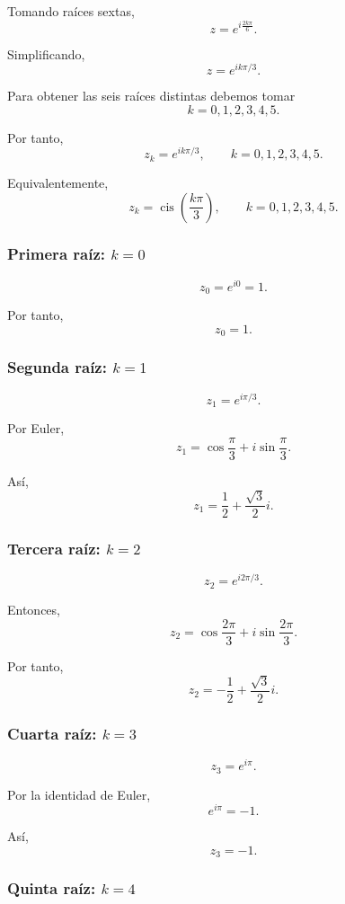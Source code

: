 \documentclass[12pt]{article}
\begin{document}
Tomando raíces sextas,
\[
z=e^{i\frac{2k\pi}{6}}.
\]

Simplificando,
\[
z=e^{ik\pi/3}.
\]

Para obtener las seis raíces distintas debemos tomar
\[
k=0,1,2,3,4,5.
\]

Por tanto,
\[
\boxed{
z_k=e^{ik\pi/3},
\qquad
k=0,1,2,3,4,5
}.
\]

Equivalentemente,
\[
\boxed{
z_k=
\operatorname{cis}\left(\frac{k\pi}{3}\right),
\qquad
k=0,1,2,3,4,5
}.
\]

\subsubsection*{Primera raíz: $k=0$}

\[
z_0=e^{i0}=1.
\]

Por tanto,
\[
\boxed{z_0=1}.
\]

\subsubsection*{Segunda raíz: $k=1$}

\[
z_1=e^{i\pi/3}.
\]

Por Euler,
\[
z_1
=
\cos\frac{\pi}{3}
+
i\sin\frac{\pi}{3}.
\]

Así,
\[
\boxed{
z_1=
\frac12+\frac{\sqrt3}{2}i
}.
\]

\subsubsection*{Tercera raíz: $k=2$}

\[
z_2=e^{i2\pi/3}.
\]

Entonces,
\[
z_2
=
\cos\frac{2\pi}{3}
+
i\sin\frac{2\pi}{3}.
\]

Por tanto,
\[
\boxed{
z_2=
-\frac12+\frac{\sqrt3}{2}i
}.
\]

\subsubsection*{Cuarta raíz: $k=3$}

\[
z_3=e^{i\pi}.
\]

Por la identidad de Euler,
\[
e^{i\pi}=-1.
\]

Así,
\[
\boxed{z_3=-1}.
\]

\subsubsection*{Quinta raíz: $k=4$}
\end{document}
